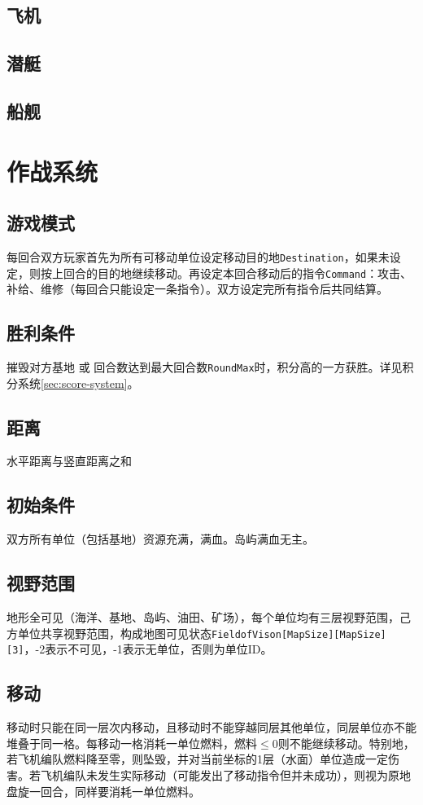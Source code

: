\documentclass[11pt,a4paper]{article}
\begin{document}
    \subsection{飞机}
    \subsection{潜艇}
    \subsection{船舰}




  \section{作战系统}
    \subsection{游戏模式}
      每回合双方玩家首先为所有可移动单位设定移动目的地\texttt{Destination}，如果未设定，则按上回合的目的地继续移动。再设定本回合移动后的指令\texttt{Command}：攻击、补给、维修（每回合只能设定一条指令）。双方设定完所有指令后共同结算。

    \subsection{胜利条件}
      摧毁对方基地 或 回合数达到最大回合数\texttt{RoundMax}时，积分高的一方获胜。详见积分系统\ref{sec:score-system}。

    \subsection{距离}
      水平距离与竖直距离之和

    \subsection{初始条件}
      双方所有单位（包括基地）资源充满，满血。岛屿满血无主。

    \subsection{视野范围}
      地形全可见（海洋、基地、岛屿、油田、矿场），每个单位均有三层视野范围，己方单位共享视野范围，构成地图可见状态\texttt{FieldofVison[MapSize][MapSize][3]}，-2表示不可见，-1表示无单位，否则为单位ID。

    \subsection{移动}
      移动时只能在同一层次内移动，且移动时不能穿越同层其他单位，同层单位亦不能堆叠于同一格。每移动一格消耗一单位燃料，燃料$\leq 0$则不能继续移动。特别地，若飞机编队燃料降至零，则坠毁，并对当前坐标的1层（水面）单位造成一定伤害。若飞机编队未发生实际移动（可能发出了移动指令但并未成功），则视为原地盘旋一回合，同样要消耗一单位燃料。
\end{document}
